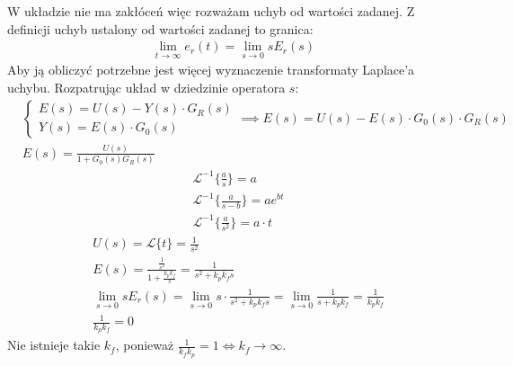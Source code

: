 \documentclass[a4paper,11pt]{article}
\begin{document}
W układzie nie ma zakłóceń więc rozważam uchyb od wartości zadanej. 
Z definicji uchyb ustalony od wartości zadanej to granica: 
\begin{align*}
\lim _{t \rightarrow \infty} e_r(t) = \lim _{s \rightarrow 0}sE_r (s)
\end{align*}
Aby ją obliczyć potrzebne jest więcej wyznaczenie transformaty Laplace'a uchybu. Rozpatrując układ w dziedzinie operatora \( s \):
\begin{align*}
&\begin{cases}
E(s)= U(s)-Y(s) \cdot G_R (s) \\
Y(s) = E(s) \cdot G_0 (s) 
\end{cases}
\implies
E(s)=U(s)-E(s)\cdot G_0(s) \cdot G_R(s) \\
&E(s)=\frac{U(s)}{1+G_0(s)G_R(s)}
\end{align*}
\begin{align*}
	& \mathscr{L}^{-1}\{\frac{a}{s}\} = a \\
	& \mathscr{L}^{-1}\{\frac{a}{s-b}\} = ae^{bt} \\
	& \mathscr{L}^{-1}\{\frac{a}{s^2}\} = a\cdot t
\end{align*}
\begin{align*}
&U(s) = \mathscr{L}\{t\}=\frac{1}{s^2} \\
&E(s) = \frac{\frac{1}{s^2}}{1+\frac{k_p k_f}{s}} = \frac{1}{s^2+k_p k_f s}\\
&\lim _{s \rightarrow 0}sE_r (s) = \lim_{s \rightarrow 0} s \cdot \frac{1}{s^2+k_p k_f s} = \lim _{s \rightarrow 0} \frac{1}{s+k_p k_f} =
\frac{1}{k_p k_f} \\
& \frac{1}{k_p k_f} = 0 
\end{align*}
Nie istnieje takie \( k_f \), ponieważ \( \frac{1}{k_f k_p} = 1 \Longleftrightarrow k_f \rightarrow \infty \). 
\end{document}
